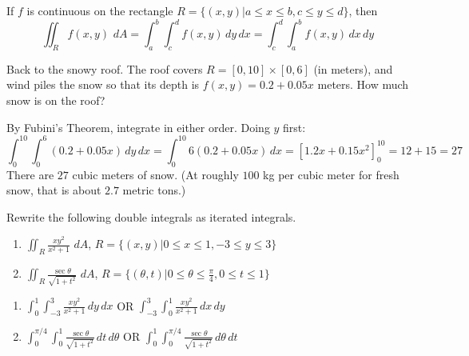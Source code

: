 \begin{mdframed}[style = important, frametitle = {Fubini's Theorem}]
If $f$ is continuous on the rectangle $R = \{ \left( x, y \right) | a \leq x 
\leq b, c \leq y \leq d \}$, then
$$\iint_R f(x,y)\,\,dA = \int_a^b \int_c^d f(x,y)\,dy\,dx = \int_c^d \int_a^b 
f(x,y)\,dx\,dy$$
\end{mdframed}

\begin{Worked}
\begin{Problem}
Back to the snowy roof. The roof covers
$R = [0, 10] \times [0, 6]$ (in meters), and wind piles the snow so that its depth is
$f(x, y) = 0.2 + 0.05x$ meters. How much snow is on the roof?
\end{Problem}
\begin{Solution}
By Fubini's Theorem, integrate in either order. Doing $y$ first:
$$\int_0^{10} \int_0^6 (0.2 + 0.05x)\,dy\,dx = \int_0^{10} 6(0.2 + 0.05x)\,dx
= \left[1.2x + 0.15x^2\right]_0^{10} = 12 + 15 = 27$$
There are $27$ cubic meters of snow. (At roughly $100$ kg per cubic meter for fresh
snow, that is about $2.7$ metric tons.)
\end{Solution}
\end{Worked}

\begin{Exercise}[title={Applying Fubini's Theorem},label = fubini_1]
Rewrite the following double integrals as iterated integrals.
\begin{enumerate}
\item $\iint_R \frac{xy^2}{x^2 + 1}\,\,dA$, $R = \{(x,y)|0 \leq x \leq 1, -3 
\leq y \leq 3\}$
\item $\iint_R \frac{\sec{\theta}}{\sqrt{1 + t^2}}\,\,dA$, $R = \{(\theta, t) |
0 \leq \theta \leq \frac{\pi}{4}, 0 \leq t \leq 1 \}$
\end{enumerate}
\vspace{40mm}
\end{Exercise}

\begin{Answer}[ref = fubini_1]
\begin{enumerate}
\item $\int_0^1 \int_{-3}^3 \frac{xy^2}{x^2 + 1}\,dy\,dx$ OR $\int_{-3}^3 
\int_0^1 \frac{xy^2}{x^2 + 1}\,dx\,dy$
\item $\int_0^{\pi/4} \int_0^1 \frac{\sec{\theta}}{\sqrt{1 + t^2}}\,dt\,
d\theta$ OR $\int_0^1 \int_0^{\pi/4} \frac{\sec{\theta}}{\sqrt{1 + t^2}}\,
d\theta \,dt$
\end{enumerate}
\end{Answer}

